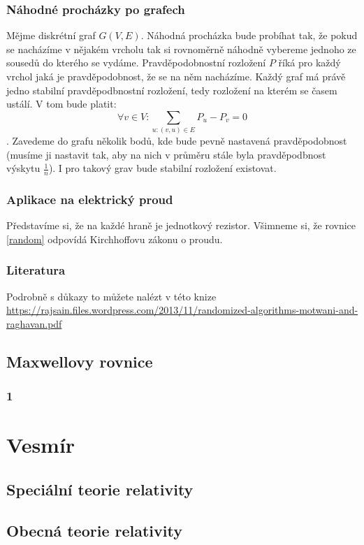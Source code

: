 \documentclass[titlepage]{book}
\begin{document}
\subsection{Náhodné procházky po grafech}
Mějme diskrétní graf $G(V,E)$. Náhodná procházka bude probíhat tak, že pokud se nacházíme v nějakém vrcholu tak si rovnoměrně náhodně vybereme jednoho ze sousedů do kterého se vydáme. Pravděpodobnostní rozložení $P$ říká pro každý vrchol jaká je pravděpodobnost, že se na něm nacházíme. Každý graf má právě jedno stabilní pravděpodbnostní rozložení, tedy rozložení na kterém se časem ustálí. V tom bude platit:\\
\begin{equation}
\forall v \in V: \sum_{u: (v,u) \in E} P_u - P_v = 0
\end{equation}. Zavedeme do grafu několik bodů, kde bude pevně nastavená pravděpodobnost (musíme ji nastavit tak, aby na nich v průměru stále byla pravděpodbnost výskytu $\frac{1}{n}$). I pro takový grav bude stabilní rozložení existovat.
\subsection{Aplikace na elektrický proud}
Představíme si, že na každé hraně je jednotkový rezistor. Všimneme si, že rovnice \ref{random} odpovídá Kirchhoffovu zákonu o proudu. 
\subsection{Literatura}
Podrobně s důkazy to můžete nalézt v této knize \\ \url{https://rajsain.files.wordpress.com/2013/11/randomized-algorithms-motwani-and-raghavan.pdf}
\section{Maxwellovy rovnice}
\subsection{1}
\chapter{Vesmír}
\section{Speciální teorie relativity}
\section{Obecná teorie relativity}
\end{document}
